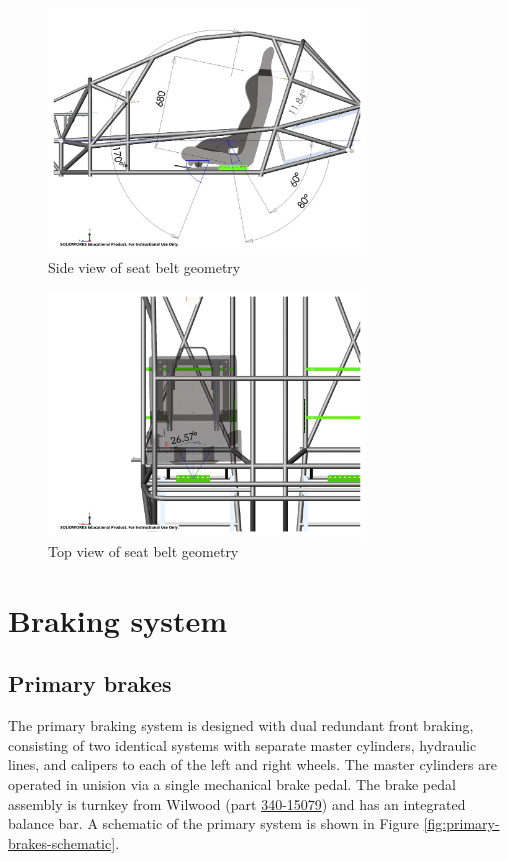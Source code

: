 \documentclass[10pt]{article}
\begin{document}
\begin{figure}
\centering
\includegraphics[width=0.75\textwidth]{figures/seat-belt-side-view}
\caption{Side view of seat belt geometry}
\label{fig:seat-belt-side-view}
\end{figure}

\begin{figure}
\centering
\includegraphics[width=0.75\textwidth]{figures/seat-belt-top-view}
\caption{Top view of seat belt geometry}
\label{fig:seat-belt-top-view}
\end{figure}

\section{Braking system}
\subsection{Primary brakes}
The primary braking system is designed with dual redundant front braking, consisting of two identical systems with separate master cylinders, hydraulic lines, and calipers to each of the left and right wheels. The master cylinders are operated in unision via a single mechanical brake pedal. The brake pedal assembly is turnkey from Wilwood (part \href{http://www.wilwood.com/Pedals/PedalProd.aspx?itemno=340-15079}{340-15079}) and has an integrated balance bar. A schematic of the primary system is shown in Figure \ref{fig:primary-brakes-schematic}.
\end{document}
